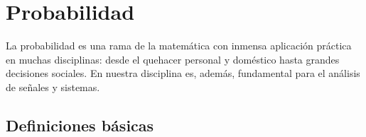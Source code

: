 \chapter{Probabilidad}

La probabilidad es una rama de la matemática con inmensa aplicación práctica en muchas disciplinas: desde el quehacer personal y doméstico hasta grandes decisiones sociales. En nuestra disciplina es, además, fundamental para el análisis de señales y sistemas.

\section{Definiciones básicas}

